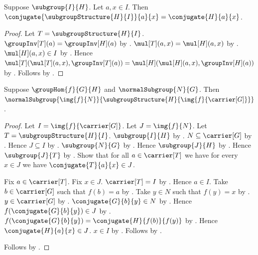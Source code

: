\begin{lemma}\label{subgroup_structure_conjugate_apply}
    Suppose $\subgroup{I}{H}$.
    Let $a,x\in I$.
    Then
        $\conjugate{\subgroupStructure{H}{I}}{a}{x}=
            \conjugate{H}{a}{x}$.
\end{lemma}
\begin{proof}
    Let $T=\subgroupStructure{H}{I}$.
    $\groupInv[T](a)=\groupInv[H](a)$ by
        .
    $\mul[T](a,x)=\mul[H](a,x)$ by
        .
    $\mul[H](a,x)\in I$ by .
    Hence
        $\mul[T](\mul[T](a,x),\groupInv[T](a))=
            \mul[H](\mul[H](a,x),\groupInv[H](a))$ by
        .
    Follows by .
\end{proof}

\begin{theorem}\label{group_hom_normal_image_in_induced_image}
    Suppose $\groupHom{f}{G}{H}$ and $\normalSubgroup{N}{G}$.
    Then
        $\normalSubgroup
            {\img{f}{N}}
            {\subgroupStructure{H}{\img{f}{\carrier[G]}}}$.
\end{theorem}
\begin{proof}
    Let $I=\img{f}{\carrier[G]}$.
    Let $J=\img{f}{N}$.
    Let $T=\subgroupStructure{H}{I}$.
    $\subgroup{I}{H}$ by .
    $N\subseteq\carrier[G]$ by .
    Hence $J\subseteq I$ by .
    $\subgroup{N}{G}$ by .
    Hence $\subgroup{J}{H}$ by .
    Hence $\subgroup{J}{T}$ by
        .
    Show that for all $a\in\carrier[T]$ we have for every $x\in J$
        we have $\conjugate{T}{a}{x}\in J$.
    \begin{subproof}
        Fix $a\in\carrier[T]$.
        Fix $x\in J$.
        $\carrier[T]=I$ by .
        Hence $a\in I$.
        Take $b\in\carrier[G]$ such that $f(b)=a$ by
            .
        Take $y\in N$ such that $f(y)=x$ by
            .
        $y\in\carrier[G]$ by
            .
        $\conjugate{G}{b}{y}\in N$ by
            .
        Hence $f(\conjugate{G}{b}{y})\in J$ by
            .
        $f(\conjugate{G}{b}{y})=
            \conjugate{H}{f(b)}{f(y)}$ by
            .
        Hence $\conjugate{H}{a}{x}\in J$.
        $x\in I$ by .
        Follows by .
    \end{subproof}
    Follows by .
\end{proof}

